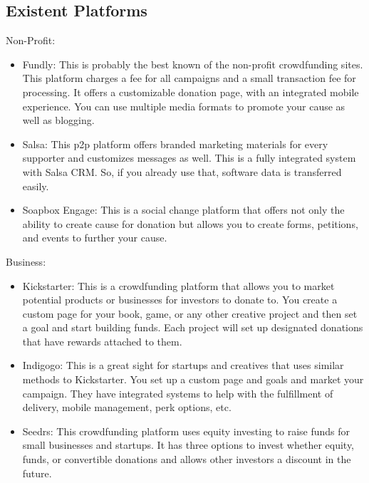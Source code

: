 \subsection*{ Existent Platforms }
Non-Profit:
\begin{itemize}
      \item
            Fundly: This is probably the best known of the non-profit crowdfunding sites. This platform charges a fee for all campaigns and a small transaction fee for processing. It offers a customizable donation page, with an integrated mobile experience. You can use multiple media formats to promote your cause as well as blogging.
      \item
            Salsa: This p2p platform offers branded marketing materials for every supporter and customizes messages as well. This is a fully integrated system with Salsa CRM. So, if you already use that, software data is transferred easily.
      \item
            Soapbox Engage: This is a social change platform that offers not only the ability to create cause for donation but allows you to create forms, petitions, and events to further your cause.
\end{itemize}
Business:
\begin{itemize}
      \item
            Kickstarter: This is a crowdfunding platform that allows you to market potential products or businesses for investors to donate to. You create a custom page for your book, game, or any other creative project and then set a goal and start building funds. Each project will set up designated donations that have rewards attached to them.
      \item
            Indigogo: This is a great sight for startups and creatives that uses similar methods to Kickstarter. You set up a custom page and goals and market your campaign. They have integrated systems to help with the fulfillment of delivery, mobile management, perk options, etc.
      \item
            Seedrs: This crowdfunding platform uses equity investing to raise funds for small businesses and startups. It has three options to invest whether equity, funds, or convertible donations and allows other investors a discount in the future.
      
\end{itemize}





